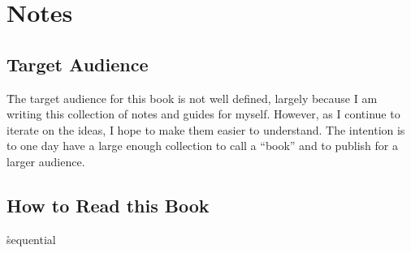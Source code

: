 \section{Notes}

\subsection{Target Audience}

\r{The target audience for this book is not well defined, largely because I am writing this collection of notes and guides for myself. However, as I continue to iterate on the ideas, I hope to make them easier to understand. The intention is to one day have a large enough collection to call a ``book'' and to publish for a larger audience.}

\subsection{How to Read this Book}
\r{sequential}



